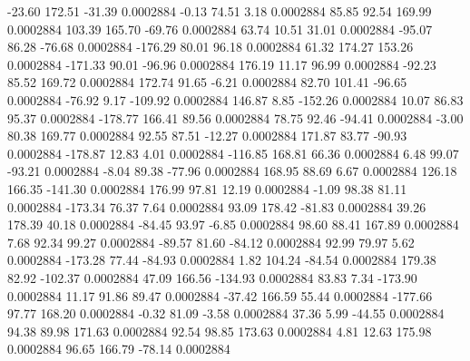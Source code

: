       -23.60      172.51      -31.39     0.0002884
       -0.13       74.51        3.18     0.0002884
       85.85       92.54      169.99     0.0002884
      103.39      165.70      -69.76     0.0002884
       63.74       10.51       31.01     0.0002884
      -95.07       86.28      -76.68     0.0002884
     -176.29       80.01       96.18     0.0002884
       61.32      174.27      153.26     0.0002884
     -171.33       90.01      -96.96     0.0002884
      176.19       11.17       96.99     0.0002884
      -92.23       85.52      169.72     0.0002884
      172.74       91.65       -6.21     0.0002884
       82.70      101.41      -96.65     0.0002884
      -76.92        9.17     -109.92     0.0002884
      146.87        8.85     -152.26     0.0002884
       10.07       86.83       95.37     0.0002884
     -178.77      166.41       89.56     0.0002884
       78.75       92.46      -94.41     0.0002884
       -3.00       80.38      169.77     0.0002884
       92.55       87.51      -12.27     0.0002884
      171.87       83.77      -90.93     0.0002884
     -178.87       12.83        4.01     0.0002884
     -116.85      168.81       66.36     0.0002884
        6.48       99.07      -93.21     0.0002884
       -8.04       89.38      -77.96     0.0002884
      168.95       88.69        6.67     0.0002884
      126.18      166.35     -141.30     0.0002884
      176.99       97.81       12.19     0.0002884
       -1.09       98.38       81.11     0.0002884
     -173.34       76.37        7.64     0.0002884
       93.09      178.42      -81.83     0.0002884
       39.26      178.39       40.18     0.0002884
      -84.45       93.97       -6.85     0.0002884
       98.60       88.41      167.89     0.0002884
        7.68       92.34       99.27     0.0002884
      -89.57       81.60      -84.12     0.0002884
       92.99       79.97        5.62     0.0002884
     -173.28       77.44      -84.93     0.0002884
        1.82      104.24      -84.54     0.0002884
      179.38       82.92     -102.37     0.0002884
       47.09      166.56     -134.93     0.0002884
       83.83        7.34     -173.90     0.0002884
       11.17       91.86       89.47     0.0002884
      -37.42      166.59       55.44     0.0002884
     -177.66       97.77      168.20     0.0002884
       -0.32       81.09       -3.58     0.0002884
       37.36        5.99      -44.55     0.0002884
       94.38       89.98      171.63     0.0002884
       92.54       98.85      173.63     0.0002884
        4.81       12.63      175.98     0.0002884
       96.65      166.79      -78.14     0.0002884
